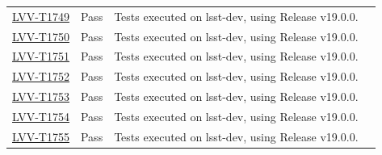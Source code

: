 \documentclass[DM,lsstdraft,STR,toc]{lsstdoc}
\begin{document}
\begin{longtable}{p{2cm}p{2.5cm}p{9cm}p{2.5cm}}
\begin{minipage}[]{9cm}
    \medskip
    \end{minipage}
    &
    \\\hline
\href{https://jira.lsstcorp.org/secure/Tests.jspa#/testCase/LVV-T1749}{LVV-T1749}
    & Pass &
    \begin{minipage}[]{9cm}
    \smallskip
     Tests executed on lsst-dev, using Release v19.0.0.

    \medskip
    \end{minipage}
    &
    \\\hline
\href{https://jira.lsstcorp.org/secure/Tests.jspa#/testCase/LVV-T1750}{LVV-T1750}
    & Pass &
    \begin{minipage}[]{9cm}
    \smallskip
     Tests executed on lsst-dev, using Release v19.0.0.

    \medskip
    \end{minipage}
    &
    \\\hline
\href{https://jira.lsstcorp.org/secure/Tests.jspa#/testCase/LVV-T1751}{LVV-T1751}
    & Pass &
    \begin{minipage}[]{9cm}
    \smallskip
     Tests executed on lsst-dev, using Release v19.0.0.

    \medskip
    \end{minipage}
    &
    \\\hline
\href{https://jira.lsstcorp.org/secure/Tests.jspa#/testCase/LVV-T1752}{LVV-T1752}
    & Pass &
    \begin{minipage}[]{9cm}
    \smallskip
     Tests executed on lsst-dev, using Release v19.0.0.

    \medskip
    \end{minipage}
    &
    \\\hline
\href{https://jira.lsstcorp.org/secure/Tests.jspa#/testCase/LVV-T1753}{LVV-T1753}
    & Pass &
    \begin{minipage}[]{9cm}
    \smallskip
     Tests executed on lsst-dev, using Release v19.0.0.

    \medskip
    \end{minipage}
    &
    \\\hline
\href{https://jira.lsstcorp.org/secure/Tests.jspa#/testCase/LVV-T1754}{LVV-T1754}
    & Pass &
    \begin{minipage}[]{9cm}
    \smallskip
     Tests executed on lsst-dev, using Release v19.0.0.

    \medskip
    \end{minipage}
    &
    \\\hline
\href{https://jira.lsstcorp.org/secure/Tests.jspa#/testCase/LVV-T1755}{LVV-T1755}
    & Pass &
    \begin{minipage}[]{9cm}
    \smallskip
     Tests executed on lsst-dev, using Release v19.0.0.


\end{minipage}
\end{longtable}
\end{document}

